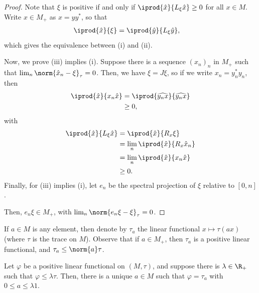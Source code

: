 \documentclass[10pt]{mypackage}
\begin{document}
\begin{proof}
  Note that $\xi$ is positive if and only if $ \iprod{\hat{x}}{L_{\xi}\hat{x}} \geq 0 $ for all $x\in M$. Write $x\in M_{+}$ as $x = yy^{\ast}$, so that
  \begin{align*}
    \iprod{\hat{x}}{\xi} &= \iprod{\hat{y}}{L_{\xi}\hat{y}},
  \end{align*}
  which gives the equivalence between (i) and (ii).

  Now, we prove (iii) implies (i). Suppose there is a sequence $\left( x_n \right)_n$ in $M_{+}$ such that $\lim_{n}\norm{\hat{x}_n-\xi}_{\tau} = 0$. Then, we have $\xi = J\xi$, so if we write $x_n = y_n^{\ast}y_n$, then
  \begin{align*}
    \iprod{\hat{x}}{x_n\hat{x}} &= \iprod{\widehat{y_n x}}{\widehat{y_n x}}\\
                                &\geq 0,
  \end{align*}
  with
  \begin{align*}
    \iprod{\hat{x}}{L_{\xi}\hat{x}} &= \iprod{\hat{x}}{R_x\xi}\\
                                    &= \lim_{n} \iprod{\hat{x}}{R_x\hat{x}_n}\\
                                    &= \lim_{n} \iprod{\hat{x}}{x_n\hat{x}}\\
                                    &\geq 0.
  \end{align*}
  Finally, for (iii) implies (i), let $e_n$ be the spectral projection of $\xi$ relative to $\left[ 0,n \right]$.

  Then, $e_n\xi\in M_{+}$, with $\lim_{n}\norm{e_n\xi - \xi}_{\tau} = 0$.
\end{proof}
If $a\in M$ is any element, then denote by $\tau_a$ the linear functional $x\mapsto \tau\left(ax \right)$ (where $\tau$ is the trace on $M$). Observe that if $a\in M_{+}$, then $\tau_a$ is a positive linear functional, and $\tau_a\leq \norm{a}\tau$.
\begin{proposition}
  Let $\varphi$ be a positive linear functional on $\left( M,\tau \right)$, and suppose there is $\lambda\in \R_{+}$ such that $\varphi\leq \lambda\tau$. Then, there is a unique $a\in M$ such that $\varphi = \tau_a$ with $0\leq a \leq \lambda 1$.
\end{proposition}
\end{document}

